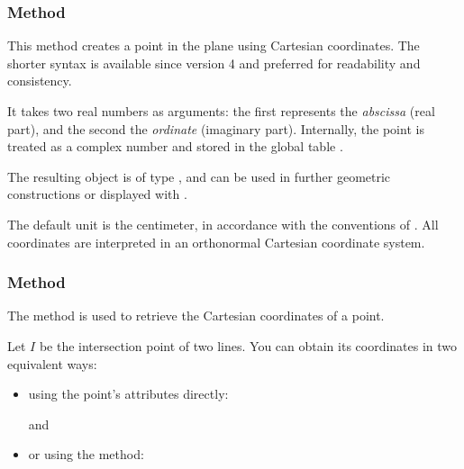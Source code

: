 \subsubsection{Method }
\label{ssub:method_point_new}

This method creates a point in the plane using Cartesian coordinates. The shorter syntax  is available since version 4 and preferred for readability and consistency.

\medskip
\noindent
It takes two real numbers as arguments: the first represents the \emph{abscissa} (real part), and the second the \emph{ordinate} (imaginary part). Internally, the point is treated as a complex number and stored in the global table .

\medskip
\noindent
The resulting object is of type , and can be used in further geometric constructions or displayed with .

\medskip
\noindent
{} The default unit is the centimeter, in accordance with the conventions of . All coordinates are interpreted in an orthonormal Cartesian coordinate system.

\vspace{1em}

\begin{tkzexample}[latex = 7cm]
\end{tkzexample}

\subsubsection{Method }
\label{ssub:method_point_get}

The  method is used to retrieve the Cartesian coordinates of a point.

\medskip
\noindent
Let $I$ be the intersection point of two lines. You can obtain its coordinates in two equivalent ways:
\begin{itemize}
  \item using the point’s attributes directly:
    \begin{center}
     \quad and \quad {}
    \end{center}
  \item or using the  method:
    \begin{center}
    \end{center}
\end{itemize}

